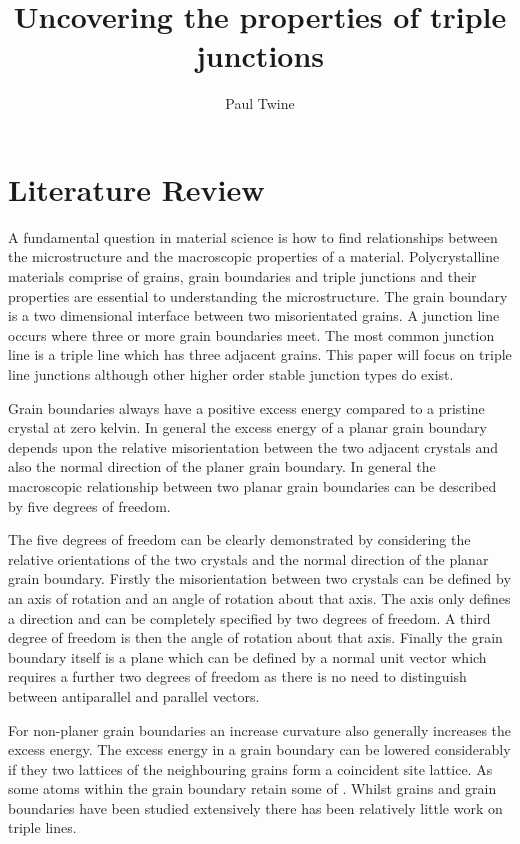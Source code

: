 \documentclass[12pt,a4paper]{book}
\title{Uncovering the properties of triple junctions}
\author{Paul Twine}
\begin{document}
\maketitle

\chapter{Literature Review}

\nocite{*}
A fundamental question in material science is how to find relationships between the microstructure and the macroscopic properties of a material. Polycrystalline materials comprise of grains, grain boundaries and triple junctions and their properties are essential to understanding the microstructure. The grain boundary is a two dimensional interface between two misorientated grains. A junction line occurs where three or more grain boundaries meet. The most common junction line is a triple line which has three adjacent grains. This paper will focus on triple line junctions although other higher order stable junction types do exist.

Grain boundaries always have a positive excess energy compared to a pristine crystal at zero kelvin. In general the excess energy of a planar grain boundary depends upon the relative misorientation between the two adjacent crystals and also the normal direction of the planer grain boundary. In general the macroscopic relationship between two planar grain boundaries can be described by five degrees of freedom. 

The five degrees of freedom can be clearly demonstrated by considering the relative orientations of the two crystals and the normal direction of the planar grain boundary. Firstly the misorientation between two crystals can be defined by an axis of rotation and an angle of rotation about that axis.  The axis only defines a direction and can be completely specified by two degrees of freedom. A third degree of freedom is then the angle of rotation about that axis. Finally the grain boundary itself is a plane which can be defined by a normal unit vector which requires a further two degrees of freedom as there is no need to distinguish between antiparallel and parallel vectors.


For non-planer grain boundaries an increase curvature also generally increases the excess energy.  The excess energy in a grain boundary can be lowered considerably if they two lattices of the neighbouring grains form a coincident site lattice. As some atoms within the grain boundary retain some of . Whilst grains and grain boundaries have been studied extensively there has been relatively little work on triple lines.
\end{document}
